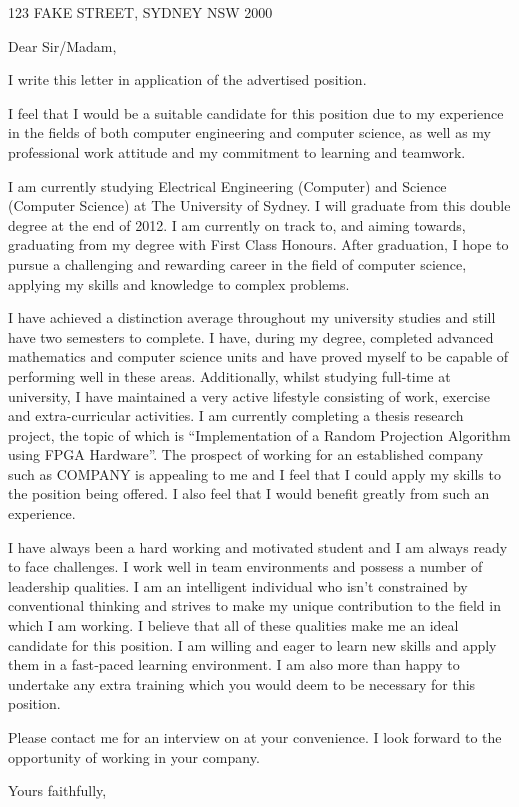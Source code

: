\documentclass{letter}
\newcommand{\company}{COMPANY}
\newcommand{\toAddress}{123 FAKE STREET, SYDNEY NSW 2000}
\begin{document}
 
\begin{letter}{\toAddress}

\opening{Dear Sir/Madam,}

I write this letter in application of the advertised position.

I feel that I would be a suitable candidate for this position due to my 
experience in the fields of both computer engineering and computer science, as 
well as my professional work attitude and my commitment to learning and 
teamwork.

I am currently studying Electrical Engineering (Computer) and Science (Computer 
Science) at The University of Sydney. I will graduate from this double degree at
the end of 2012. I am currently on track to, and aiming towards, graduating from
my degree with First Class Honours. After graduation, I hope to pursue a 
challenging and rewarding career in the field of computer science, applying my 
skills and knowledge to complex problems.

I have achieved a distinction average throughout my university studies and still
have two semesters to complete. I have, during my degree, completed advanced 
mathematics and computer science units and have proved myself to be capable of 
performing well in these areas. Additionally, whilst studying full-time at 
university, I have maintained a very active lifestyle consisting of work, 
exercise and extra-curricular activities. I am currently completing a thesis 
research project, the topic of which is ``Implementation of a Random Projection 
Algorithm using FPGA Hardware''. The prospect of working for an established 
company such as \company{} is appealing to me and I feel that I could apply my 
skills to the position being offered. I also feel that I would benefit greatly 
from such an experience.

I have always been a hard working and motivated student and I am always ready to
face challenges. I work well in team environments and possess a number of 
leadership qualities. I am an intelligent individual who isn't constrained by 
conventional thinking and strives to make my unique contribution to the field in
which I am working. I believe that all of these qualities make me an ideal
candidate for this position. I am willing and eager to learn new skills and 
apply them in a fast‐paced learning environment. I am also more than happy to 
undertake any extra training which you would deem to be necessary for this 
position.

Please contact me for an interview on \myMobile{} at your convenience. I look 
forward to the opportunity of working in your company.

\closing{Yours faithfully,}

\end{letter}
\end{document}
